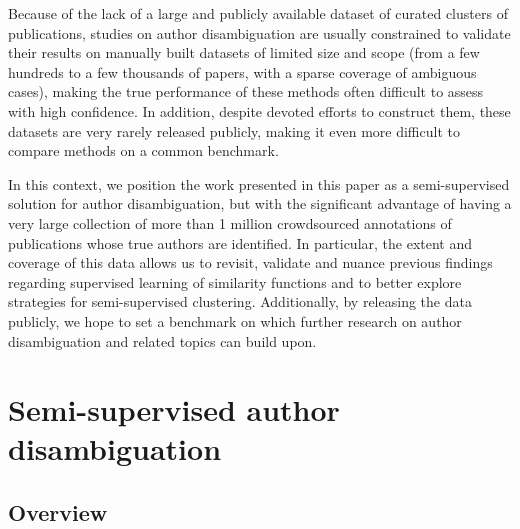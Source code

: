 \documentclass{article}
\begin{document}
Because of the lack of a large and publicly available dataset of curated
clusters of publications, studies on author disambiguation are usually
constrained to validate their results on manually built datasets of limited
size and scope (from a few hundreds to a few thousands of papers, with a sparse
coverage of ambiguous cases), making the true performance of these methods
often difficult to assess with high confidence. In addition, despite devoted
efforts to construct them, these datasets are very rarely released publicly,
making it even more difficult to compare methods on a common benchmark.

In this context, we position the work presented in this paper as a
semi-supervised  solution for author disambiguation, but with the significant
advantage of having a very large collection of more than 1 million crowdsourced annotations
of publications whose true authors are identified. In particular, the extent and coverage
of this data allows us to revisit, validate and nuance previous findings regarding
supervised learning of similarity functions and to better explore strategies
for semi-supervised clustering. Additionally, by releasing the data publicly,
we hope to set a benchmark on which further research on author disambiguation
and related topics can  build upon.




\section{Semi-supervised author disambiguation}
\label{methods}

\subsection{Overview}
\end{document}
